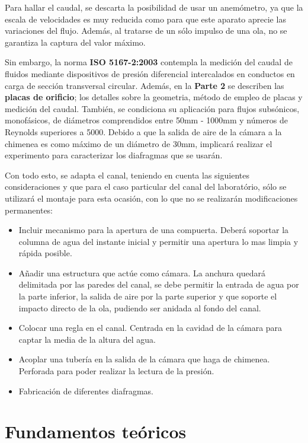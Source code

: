 Para hallar el caudal, se descarta la posibilidad de usar un anemómetro,
ya que la escala de velocidades es muy reducida como para que este
aparato aprecie las variaciones del flujo. Además, al tratarse de un
sólo impulso de una ola, no se garantiza la captura del valor máximo.

Sin embargo, la norma \textbf{ISO 5167-2:2003} contempla la medición del
caudal de fluidos mediante dispositivos de presión diferencial
intercalados en conductos en carga de sección transversal circular.
Además, en la \textbf{Parte 2} se describen las \textbf{placas de
orificio}; los detalles sobre la geometria, método de empleo de placas y
medición del caudal. También, se condiciona su aplicación para flujos
subsónicos, monofásicos, de diámetros comprendidos entre 50mm - 1000mm y
números de Reynolds superiores a 5000. Debido a que la salida de aire de
la cámara a la chimenea es como máximo de un diámetro de 30mm, implicará
realizar el experimento para caracterizar los diafragmas que se usarán.

Con todo esto, se adapta el canal, teniendo en cuenta las siguientes
consideraciones y que para el caso particular del canal del laboratório,
sólo se utilizará el montaje para esta ocasión, con lo que no se
realizarán modificaciones permanentes: \\

\begin{itemize}
\item
  Incluir mecanismo para la apertura de una compuerta. Deberá soportar
  la columna de agua del instante inicial y permitir una apertura lo mas
  limpia y rápida posible.
\item
  Añadir una estructura que actúe como cámara. La anchura quedará
  delimitada por las paredes del canal, se debe permitir la entrada de
  agua por la parte inferior, la salida de aire por la parte superior y
  que soporte el impacto directo de la ola, pudiendo ser anidada al
  fondo del canal.
\item
  Colocar una regla en el canal. Centrada en la cavidad de la cámara
  para captar la media de la altura del agua.
\item
  Acoplar una tubería en la salida de la cámara que haga de chimenea.
  Perforada para poder realizar la lectura de la presión.
\item
  Fabricación de diferentes diafragmas.
\end{itemize}

\section{Fundamentos teóricos}\label{header-n45}

